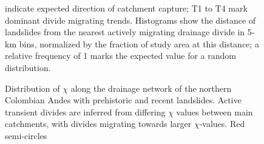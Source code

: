 \documentclass[draft]{agujournal2019}
\begin{document}
\begin{figure}[ht!]
  \begin{minipage}{.48\linewidth}
    \centering
  \end{minipage}\quad
  \begin{minipage}{.48\linewidth}
    \centering
  \end{minipage} 
    \caption{Distribution of $\chi$ along the drainage network of the northern Colombian Andes with prehistoric and recent landslides. Active transient divides are inferred from differing $\chi$ values between main catchments, with divides migrating towards larger $\chi$-values. Red semi-circles} indicate expected direction of catchment capture; T1 to T4 mark dominant divide migrating trends. Histograms show the distance of landslides from the nearest actively migrating drainage divide in 5-km bins, normalized by the fraction of study area at this distance; a relative frequency of 1 marks the expected value for a random distribution.
    \label{fig:rel-rec}
\end{figure}
\end{document}
